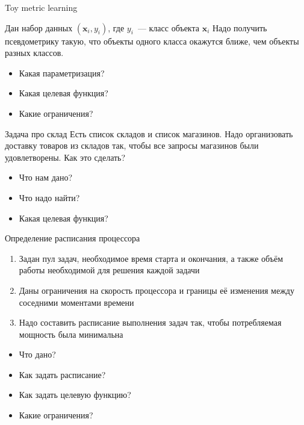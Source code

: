 \documentclass{beamer}
\newcommand{\bx}{\mathbf{x}}
\begin{document}
\begin{frame}{Toy metric learning}

Дан набор данных $(\bx_i, y_i)$, где $y_i$~--- класс объекта $\bx_i$
Надо получить псевдометрику такую, что объекты одного класса окажутся ближе, чем объекты разных классов.

\pause
\begin{itemize}[<+->]
\item Какая параметризация?
\item Какая целевая функция?
\item Какие ограничения?
\end{itemize}
\end{frame}

\begin{frame}{Задача про склад}
Есть список складов и список магазинов. 
Надо организовать доставку товаров из складов так, чтобы все запросы магазинов были удовлетворены.
Как это сделать?

\begin{itemize}[<+->]
\item Что нам дано?
\item Что надо найти?
\item Какая целевая функция?
\end{itemize}

\end{frame}

\begin{frame}{Определение расписания процессора}
\begin{enumerate}
\item Задан пул задач, необходимое время старта и окончания, а также объём работы необходимой для решения каждой задачи
\item Даны ограничения на скорость процессора и границы её изменения между соседними моментами времени
\item Надо составить расписание выполнения задач так, чтобы потребляемая мощность была минимальна
\end{enumerate}

\pause

\begin{itemize}[<+->]
\item Что дано?
\item Как задать расписание?
\item Как задать целевую функцию?
\item Какие ограничения?
\end{itemize}

\end{frame}
\end{document}

